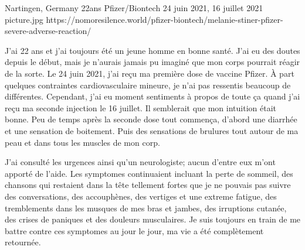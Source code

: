           {Nartingen, Germany}
          {22ans}
          {Pfizer/Biontech}
          {24 juin 2021, 16 juillet 2021}
          {}
          {picture.jpg}
          {https://nomoresilence.world/pfizer-biontech/melanie-stiner-pfizer-severe-adverse-reaction/}
          {

J'ai 22 ans et j'ai toujours été un jeune homme en bonne santé. J'ai eu des
doutes depuis le début, mais je n'aurais jamais pu imaginé que mon corps
pourrait réagir de la sorte. Le 24 juin 2021, j'ai reçu ma première dose de
vaccine Pfizer. À part quelques contraintes cardiovasculaire mineure, je n'ai
pas ressentis beaucoup de différentes. Cependant, j'ai eu moment sentiments à
propos de toute ça quand j'ai reçu ma seconde injection le 16 juillet. Il
semblerait que mon intuition était bonne. Peu de temps après la seconde dose
tout commença, d'abord une diarrhée et une sensation de boitement. Puis des
sensations de brulures tout autour de ma peau et dans tous les muscles de mon
corp.

J'ai consulté les urgences ainsi qu'un neurologiste; aucun d'entre eux m'ont
apporté de l'aide. Les symptomes continuaient incluant la perte de sommeil, des
chansons qui restaient dans la tête tellement fortes que je ne pouvais pas
suivre des conversations, des accouphènes, des vertiges et une extreme fatigue,
des tremblements dans les musques de mes bras et jambes, des irruptions cutanée,
des crises de paniques et des douleurs musculaires. Je suis toujours en train de
me battre contre ces symptomes au jour le jour, ma vie a été complètement
retournée.

}
